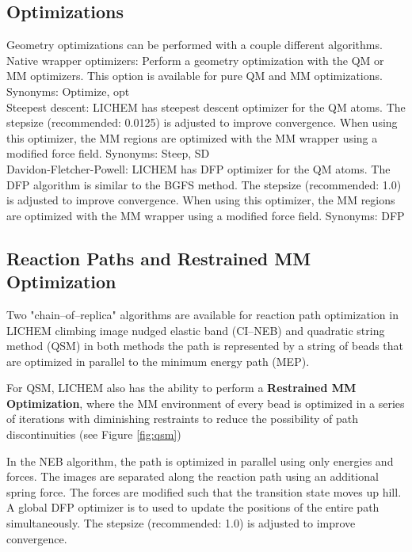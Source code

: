 \documentclass[12pt]{report}
\begin{document}
\subsection{Optimizations}

Geometry optimizations can be performed with a couple different algorithms.
\\

Native wrapper optimizers: Perform a geometry optimization with the QM or
MM optimizers.
This option is available for pure QM and MM optimizations.
Synonyms: Optimize, opt \\

Steepest descent: LICHEM has steepest descent 
optimizer \textcolor{red}{\cite{Press2007}} 
for the QM
atoms.
The stepsize (recommended: 0.0125) is adjusted to improve convergence.
When using this optimizer, the MM regions are optimized with the MM wrapper
using a modified force field.
Synonyms: Steep, SD \\

Davidon-Fletcher-Powell: LICHEM has DFP 
optimizer \textcolor{red}{\cite{Press2007,Sheppard2008_DFP}} 
for the QM atoms.
The DFP algorithm is similar to the BGFS method.
The stepsize (recommended: 1.0) is adjusted to improve convergence.
When using this optimizer, the MM regions are optimized with the MM wrapper
using a modified force field.
Synonyms: DFP

\subsection{Reaction Paths and Restrained MM Optimization}

Two "chain--of--replica" algorithms are available
for reaction path optimization in LICHEM 
climbing image nudged elastic band (CI--NEB) 
\textcolor{red}{\cite{NEB2000_A,NEB2000_B}}
and quadratic string method (QSM) \cite{Burger2006} 
in both methods the path is represented by a string of beads
that are optimized in parallel to the minimum energy path (MEP).

For QSM, LICHEM also has the ability to perform a {\bf Restrained
MM Optimization}, where the MM environment of every bead is
optimized in a series of iterations with diminishing restraints to
reduce the possibility of path discontinuities (see Figure \ref{fig:qsm})
\cite{Xie2004,AndresCisneros2009}

In the NEB algorithm, the path is optimized in parallel using only energies
and forces. The images are separated along the reaction path using
an additional spring force.  The forces
are modified such that the transition state moves up hill.
A global DFP optimizer is to used to update the positions of the entire path
simultaneously.
The stepsize (recommended: 1.0) is adjusted to improve convergence.
\end{document}
